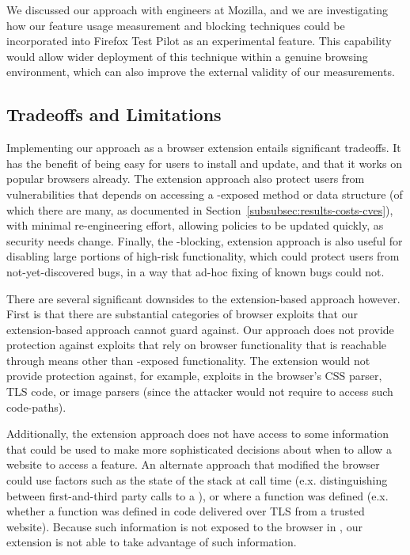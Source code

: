 We discussed our approach with engineers at Mozilla, and we are
investigating how our feature usage measurement and blocking techniques could be
incorporated into Firefox Test Pilot as an experimental feature. This
capability would allow wider deployment of this technique within a genuine
browsing environment, which can also improve the external validity of our
measurements.

\subsection{Tradeoffs and Limitations}
Implementing our approach as a browser extension entails significant tradeoffs.
It has the benefit of being easy for users to install and update, and that
it works on popular browsers already.  The extension approach also protect users
from vulnerabilities that depends on accessing a \JS-exposed
method or data structure (of which there are many, as documented in
Section~\ref{subsubsec:results-costs-cves}), with minimal re-engineering effort,
allowing policies to be updated quickly, as security needs change.  Finally,
the \WAS-blocking, extension approach is also useful for disabling large
portions of high-risk functionality, which could protect users from not-yet-discovered
bugs, in a way that ad-hoc fixing of known bugs could not.

There are several significant downsides to the extension-based approach however.
First is that there are substantial categories of browser exploits that our
extension-based approach cannot guard against.  Our approach does not provide
protection against exploits that rely on browser functionality that is reachable
through means other than \JS-exposed functionality.  The extension would not
provide protection against, for example, exploits in the browser's CSS parser,
TLS code, or image parsers (since the attacker would not require \JS to
access such code-paths).

Additionally, the extension approach does not have access to some
information that could be used to make more sophisticated decisions about
when to allow a website to access a feature.  An alternate approach that
modified the browser could use factors such as the state of the stack at
call time (e.x. distinguishing between first-and-third party calls
to a \WAS), or where a function was defined (e.x. whether a function was defined
in \JS code delivered over TLS from a trusted website).  Because such information
is not exposed to the browser in \JS, our extension is not able to take advantage
of such information.

